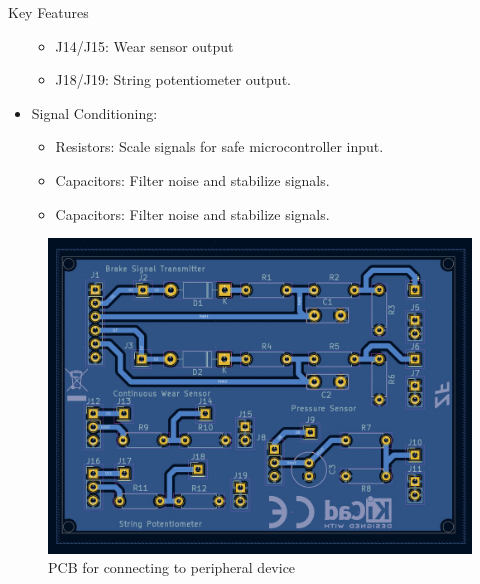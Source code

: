 \documentclass[8pt,compress,aspectratio=169]{beamer}
\begin{document}
\begin{frame}
\begin{minipage}{0.5\textwidth}
\begin{block}{Key Features}
\begin{itemize}
\begin{itemize}
            \item J14/J15: Wear sensor output
            \item J18/J19: String potentiometer output.
          \end{itemize}
        \item Signal Conditioning:
          \begin{itemize}
              \footnotesize
            \item Resistors: Scale signals for safe microcontroller input.
            \item Capacitors: Filter noise and stabilize signals.
            \item Capacitors: Filter noise and stabilize signals.
          \end{itemize}
      \end{itemize}
    \end{block}
  \end{minipage}
  \hfill
  \begin{minipage}{0.45\textwidth}
    \begin{figure}
      \includegraphics[width=\textwidth]{assets/electronic/peri_pcb.jpg}
      \caption{PCB for connecting to peripheral device}
    \end{figure}
  \end{minipage}
\end{frame}
\end{document}
